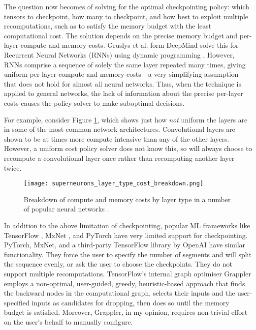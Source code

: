 The question now becomes of solving for the optimal checkpointing policy: which tensors to checkpoint, how many to checkpoint, and how best to exploit multiple recomputations, such as to satisfy the memory budget with the least computational cost. The solution depends on the precise memory budget and per-layer compute and memory costs. Gruslys et al. form DeepMind solve this for Recurrent Neural Networks (RNNs) using dynamic programming \cite{Gruslys2016}. However, RNNs comprise a sequence of solely the same layer repeated many times, giving uniform per-layer compute and memory costs - a very simplifying assumption that does not hold for almost all neural networks.
Thus, when the technique is applied to general networks, the lack of information about the precise per-layer costs causes the policy solver to make suboptimal decisions.

For example, consider Figure \ref{fig:1-layer-type-cost-breakdown}, which shows just how \textit{not} uniform the layers are in some of the most common network architectures.
Convolutional layers are shown to be at times more compute intensive than any of the other layers.
However, a uniform cost policy solver does not know this, so will always choose to recompute a convolutional layer once rather than recomputing another layer twice.

\begin{figure}[t]
    \centering
    \texttt{[image: superneurons\_layer\_type\_cost\_breakdown.png]}
    \caption{Breakdown of compute and memory costs by layer type in a number of popular neural networks \cite[Figure~8]{Wang2018}.}
    \label{fig:1-layer-type-cost-breakdown}
\end{figure}

In addition to the above limitation of checkpointing, popular ML frameworks like TensorFlow \cite{tensorflow2015-whitepaper}, MxNet \cite{mxnet2015}, and PyTorch \cite{Paszke2017} have very limited support for checkpointing. PyTorch, MxNet, and a third-party TensorFlow library by OpenAI \cite{openai-checkpointing} have similar functionality. They force the user to specify the number of segments and will split the sequence evenly, or ask the user to choose the checkpoints. They do not support multiple recomputations. TensorFlow's internal graph optimiser Grappler employs a non-optimal, user-guided, greedy, heuristic-based approach that finds the backward nodes in the computational graph, selects their inputs and the user-specified inputs as candidates for dropping, then does so until the memory budget is satisfied. Moreover, Grappler, in my opinion, requires non-trivial effort on the user's behalf to manually configure.

